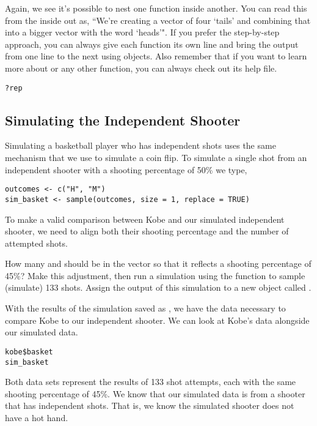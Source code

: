 \documentclass[11pt]{article}
\begin{document}
Again, we see it's possible to nest one function inside another.  You can read this from the inside out as, ``We're creating a vector of four `tails' and combining that into a bigger vector with the word `heads'".  If you prefer the step-by-step approach, you can always give each function its own line and bring the output from one line to the next using objects.  Also remember that if you want to learn more about  or any other function, you can always check out its help file.

\begin{lstlisting}
?rep
\end{lstlisting}


\subsection*{Simulating the Independent Shooter}
Simulating a basketball player who has independent shots uses the same mechanism that we use to simulate a coin flip.  To simulate a single shot from an independent shooter with a shooting percentage of 50\% we type,

\begin{lstlisting}
outcomes <- c("H", "M") 
sim_basket <- sample(outcomes, size = 1, replace = TRUE)
\end{lstlisting}

To make a valid comparison between Kobe and our simulated independent shooter, we need to align both their shooting percentage and the number of attempted shots.

\begin{exercise}
\label{simBasket}
How many  and  should be in the  vector so that it reflects a shooting percentage of 45\%?  Make this adjustment, then run a simulation using the  function to sample (simulate) 133 shots.  Assign the output of this simulation to a new object called .
\end{exercise}

With the results of the simulation saved as , we have the data necessary to compare Kobe to our independent shooter.  We can look at Kobe's data alongside our simulated data.

\begin{lstlisting}
kobe$basket
sim_basket
\end{lstlisting}


Both data sets represent the results of 133 shot attempts, each with the same shooting percentage of 45\%.  We know that our simulated data is from a shooter that has independent shots. That is, we know the simulated shooter does not have a hot hand.
\end{document}
